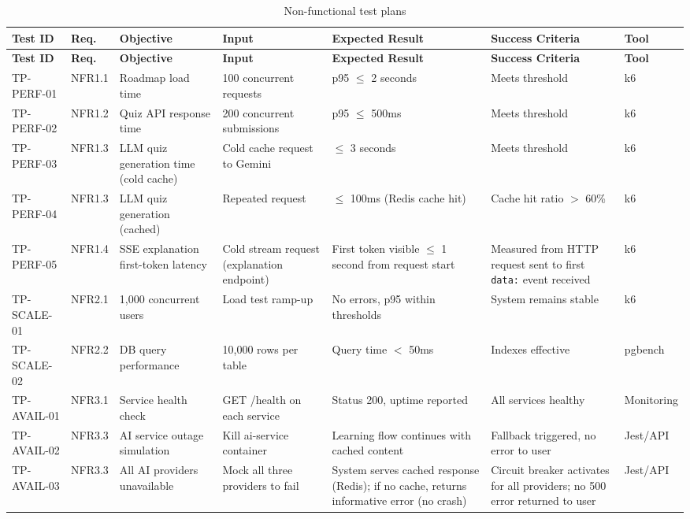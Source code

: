 \begin{longtable}{p{1.8cm}p{1.5cm}p{2.5cm}p{2.5cm}p{2.5cm}p{1.8cm}p{1.2cm}}
\caption{Non-functional test plans}
\label{tab:nonfunc-test-plans}\\
\toprule
\textbf{Test ID} & \textbf{Req.} & \textbf{Objective} & \textbf{Input} & \textbf{Expected Result} & \textbf{Success Criteria} & \textbf{Tool} \\
\midrule
\endfirsthead
\toprule
\textbf{Test ID} & \textbf{Req.} & \textbf{Objective} & \textbf{Input} & \textbf{Expected Result} & \textbf{Success Criteria} & \textbf{Tool} \\
\midrule
\endhead
TP-PERF-01 & NFR1.1 & Roadmap load time & 100 concurrent requests & p95 $\le$ 2 seconds & Meets threshold & k6 \\
TP-PERF-02 & NFR1.2 & Quiz API response time & 200 concurrent submissions & p95 $\le$ 500ms & Meets threshold & k6 \\
TP-PERF-03 & NFR1.3 & LLM quiz generation time (cold cache) & Cold cache request to Gemini & $\le$ 3 seconds & Meets threshold & k6 \\
TP-PERF-04 & NFR1.3 & LLM quiz generation (cached) & Repeated request & $\le$ 100ms (Redis cache hit) & Cache hit ratio $>$ 60\% & k6 \\
TP-PERF-05 & NFR1.4 & SSE explanation first-token latency & Cold stream request (explanation endpoint) & First token visible $\le$ 1 second from request start & Measured from HTTP request sent to first \texttt{data:} event received & k6 \\
TP-SCALE-01 & NFR2.1 & 1,000 concurrent users & Load test ramp-up & No errors, p95 within thresholds & System remains stable & k6 \\
TP-SCALE-02 & NFR2.2 & DB query performance & 10,000 rows per table & Query time $<$ 50ms & Indexes effective & pgbench \\
TP-AVAIL-01 & NFR3.1 & Service health check & GET /health on each service & Status 200, uptime reported & All services healthy & Monitoring \\
TP-AVAIL-02 & NFR3.3 & AI service outage simulation & Kill ai-service container & Learning flow continues with cached content & Fallback triggered, no error to user & Jest/API \\
TP-AVAIL-03 & NFR3.3 & All AI providers unavailable & Mock all three providers to fail & System serves cached response (Redis); if no cache, returns informative error (no crash) & Circuit breaker activates for all providers; no 500 error returned to user & Jest/API \\

\end{longtable}
